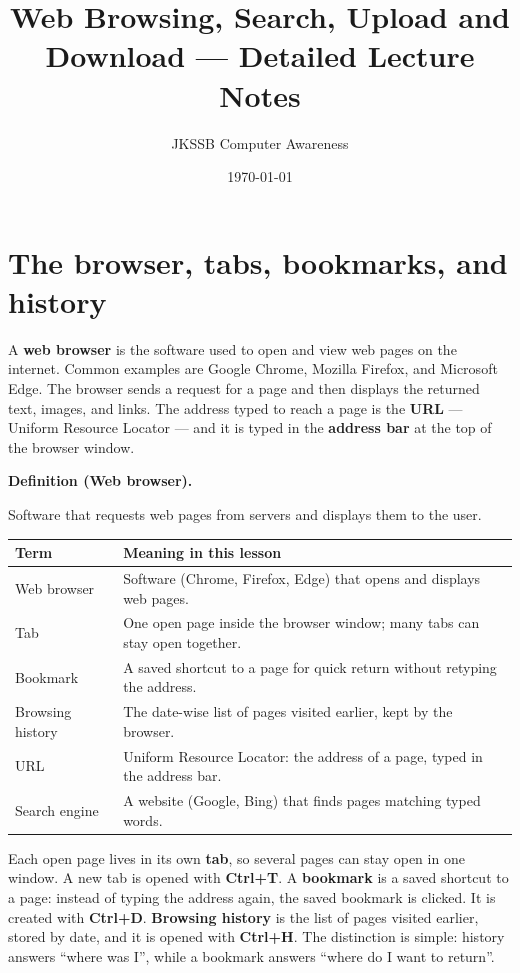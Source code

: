\documentclass[11pt]{article}
\title{Web Browsing, Search, Upload and Download --- Detailed Lecture Notes}
\author{JKSSB Computer Awareness}
\date{\today}
\newenvironment{definitionbox}[1]{%
  \par\noindent\textbf{Definition (#1).}\ \itshape
}{\par\vspace{0.3em}}
\begin{document}
\maketitle

\section{The browser, tabs, bookmarks, and history}
A \textbf{web browser} is the software used to open and view web pages on the
internet. Common examples are Google Chrome, Mozilla Firefox, and Microsoft
Edge. The browser sends a request for a page and then displays the returned
text, images, and links. The address typed to reach a page is the \textbf{URL}
--- Uniform Resource Locator --- and it is typed in the \textbf{address bar}
at the top of the browser window.

\begin{definitionbox}{Web browser}
Software that requests web pages from servers and displays them to the user.
\end{definitionbox}

\begin{center}
\begin{tabular}{p{}p{}}
\toprule
\textbf{Term} & \textbf{Meaning in this lesson} \\
\midrule
Web browser & Software (Chrome, Firefox, Edge) that opens and displays web pages. \\
Tab & One open page inside the browser window; many tabs can stay open together. \\
Bookmark & A saved shortcut to a page for quick return without retyping the address. \\
Browsing history & The date-wise list of pages visited earlier, kept by the browser. \\
URL & Uniform Resource Locator: the address of a page, typed in the address bar. \\
Search engine & A website (Google, Bing) that finds pages matching typed words. \\
\bottomrule
\end{tabular}
\end{center}

Each open page lives in its own \textbf{tab}, so several pages can stay open
in one window. A new tab is opened with \textbf{Ctrl+T}. A \textbf{bookmark}
is a saved shortcut to a page: instead of typing the address again, the saved
bookmark is clicked. It is created with \textbf{Ctrl+D}. \textbf{Browsing
history} is the list of pages visited earlier, stored by date, and it is
opened with \textbf{Ctrl+H}. The distinction is simple: history answers
``where was I'', while a bookmark answers ``where do I want to return''.
\end{document}
